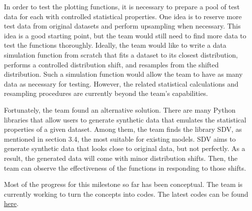 \documentclass[
	letterpaper, %
	12pt, %
]{CSUniSchoolLabReport}
\begin{document}
In order to test the plotting functions, it is necessary to prepare a pool of test data for each with controlled statistical properties. One idea is to reserve more test data from original datasets and perform upsampling when necessary. This idea is a good starting point, but the team would still need to find more data to test the functions thoroughly. Ideally, the team would like to write a data simulation function from scratch that fits a dataset to its closest distribution, performs a controlled distribution shift, and resamples from the shifted distribution. Such a simulation function would allow the team to have as many data as necessary for testing. However, the related statistical calculations and resampling procedures are currently beyond the team’s capabilities. \par

Fortunately, the team found an alternative solution. There are many Python libraries that allow users to generate synthetic data that emulates the statistical properties of a given dataset. Among them, the team finds the library SDV, as mentioned in section 3.4, the most suitable for existing models. SDV aims to generate synthetic data that looks close to original data, but not perfectly. As a result, the generated data will come with minor distribution shifts. Then, the team can observe the effectiveness of the functions in responding to those shifts. \par
Most of the progress for this milestone so far has been conceptual. The team is currently working to turn the concepts into codes. The latest codes can be found \href{https://github.com/VincentWGan/Model-Monitoring}{here}. 

\clearpage
\printbibliography %
\end{document}
